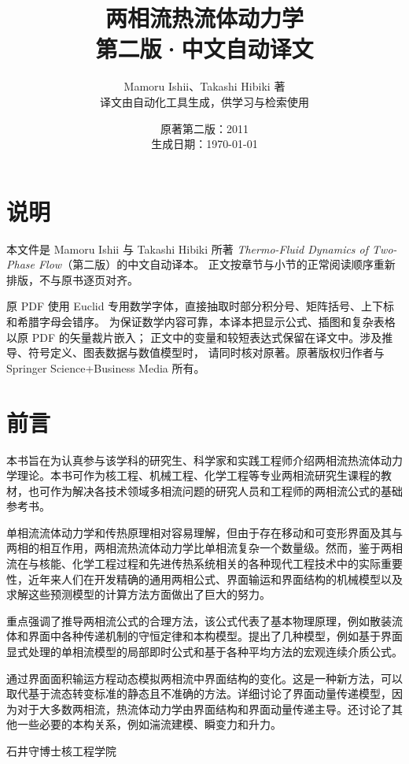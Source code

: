 \documentclass[11pt,a4paper,openany,fontset=none]{ctexbook}
\title{两相流热流体动力学\\[0.5em]\Large 第二版·中文自动译文}
\author{Mamoru Ishii、Takashi Hibiki 著\\
\small 译文由自动化工具生成，供学习与检索使用}
\date{原著第二版：2011\\生成日期：\today}
\begin{document}
\frontmatter
\maketitle
\chapter*{说明}
本文件是 Mamoru Ishii 与 Takashi Hibiki 所著
\emph{Thermo-Fluid Dynamics of Two-Phase Flow}（第二版）的中文自动译本。
正文按章节与小节的正常阅读顺序重新排版，不与原书逐页对齐。

原 PDF 使用 Euclid 专用数学字体，直接抽取时部分积分号、矩阵括号、上下标和希腊字母会错序。
为保证数学内容可靠，本译本把显示公式、插图和复杂表格以原 PDF 的矢量裁片嵌入；
正文中的变量和较短表达式保留在译文中。涉及推导、符号定义、图表数据与数值模型时，
请同时核对原著。原著版权归作者与 Springer Science+Business Media 所有。

\begingroup
\small
\tableofcontents
\endgroup
\clearpage
\makeatletter\@mainmattertrue\makeatother
{}
\begingroup\let\clearpage\relax
\chapter*{前言}
\endgroup
本书旨在为认真参与该学科的研究生、科学家和实践工程师介绍两相流热流体动力学理论。本书可作为核工程、机械工程、化学工程等专业两相流研究生课程的教材，也可作为解决各技术领域多相流问题的研究人员和工程师的两相流公式的基础参考书。

单相流流体动力学和传热原理相对容易理解，但由于存在移动和可变形界面及其与两相的相互作用，两相流热流体动力学比单相流复杂一个数量级。然而，鉴于两相流在与核能、化学工程过程和先进传热系统相关的各种现代工程技术中的实际重要性，近年来人们在开发精确的通用两相公式、界面输运和界面结构的机械模型以及求解这些预测模型的计算方法方面做出了巨大的努力。

重点强调了推导两相流公式的合理方法，该公式代表了基本物理原理，例如散装流体和界面中各种传递机制的守恒定律和本构模型。提出了几种模型，例如基于界面显式处理的单相流模型的局部即时公式和基于各种平均方法的宏观连续介质公式。

通过界面面积输运方程动态模拟两相流中界面结构的变化。这是一种新方法，可以取代基于流态转变标准的静态且不准确的方法。详细讨论了界面动量传递模型，因为对于大多数两相流，热流体动力学由界面结构和界面动量传递主导。还讨论了其他一些必要的本构关系，例如湍流建模、瞬变力和升力。

石井守博士核工程学院
\end{document}
